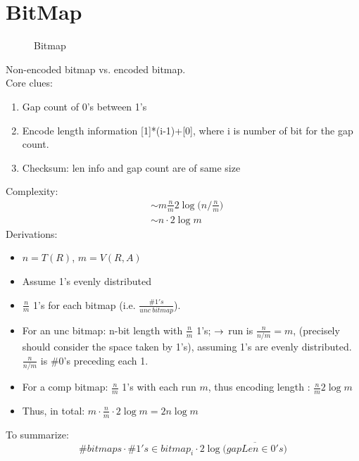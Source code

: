 \documentclass[a4paper]{report}
\begin{document}
\section{BitMap}
\begin{figure}[H]
\centering
{}
\caption{Bitmap}
\label{fig:LABEL}
\end{figure}
Non-encoded bitmap vs. encoded bitmap. 
\\
Core clues:
\begin{enumerate}
\item Gap count of 0's between 1's
\item Encode length information [1]*(i-1)+[0], where i is number of bit for the gap count.
\item Checksum: len info and gap count are of same size
\end{enumerate}
Complexity: 
\begin{align*}
& \sim m \frac{n}{m} 2\log\Big(n/\frac{n}{m} \Big) \\
& \sim n \cdot 2\log m 
\end{align*}
Derivations:
\begin{itemize}
\item $n = T(R)$, $m = V(R, A)$
\item Assume 1's evenly distributed 
\item $\frac{n}{m}$ 1's for each bitmap (i.e. $\frac{\#1's}{unc\ bitmap}$).
\item For an unc bitmap: n-bit length with $\frac{n}{m}$ 1's; $\rightarrow$ run is $\frac{n}{n/m}=m$, (precisely should consider the space taken by 1's), assuming 1's are evenly distributed. $\frac{n}{n/m}$ is \#0's preceding each 1. 
\item For a comp bitmap: $\frac{n}{m}$ 1's with each run $m$, thus encoding length : $\frac{n}{m} 2 \log m$
\item Thus, in total: $m \cdot \frac{n}{m} \cdot 2 \log{m} = 2n\log m$
\end{itemize}

To summarize: 
$$
\#bitmaps \cdot \#1's\in bitmap_i \cdot 2\log\Big(\overline{gapLen\in 0's}\Big)
$$
\end{document}
